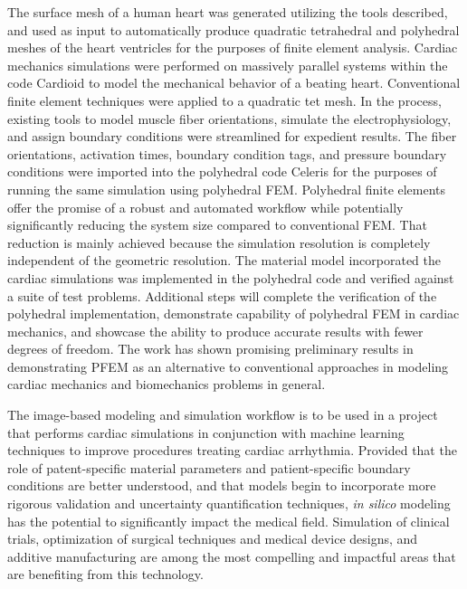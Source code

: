 The surface mesh of a human heart was generated utilizing the tools described, and used as input to automatically produce quadratic tetrahedral and polyhedral meshes of the heart ventricles for the purposes of finite element analysis. Cardiac mechanics simulations were performed on massively parallel systems within the code Cardioid to model the mechanical behavior of a beating heart. Conventional finite element techniques were applied to a quadratic tet mesh. In the process, existing tools to model muscle fiber orientations, simulate the electrophysiology, and assign boundary conditions were streamlined for expedient results. The fiber orientations, activation times, boundary condition tags, and pressure boundary conditions were imported into the polyhedral code Celeris for the purposes of running the same simulation using polyhedral FEM. Polyhedral finite elements offer the promise of a robust and automated workflow while potentially significantly reducing the system size compared to conventional FEM. That reduction is mainly achieved because the simulation resolution is completely independent of the geometric resolution. The material model incorporated the cardiac simulations was implemented in the polyhedral code and verified against a suite of test problems. Additional steps will complete the verification of the polyhedral implementation, demonstrate capability of polyhedral FEM in cardiac mechanics, and showcase the ability to produce accurate results with fewer degrees of freedom. The work has shown promising preliminary results in demonstrating PFEM as an alternative to conventional approaches in modeling cardiac mechanics and biomechanics problems in general.

The image-based modeling and simulation workflow is to be used in a project that performs cardiac simulations in conjunction with machine learning techniques to improve procedures treating cardiac arrhythmia. Provided that the role of patent-specific material parameters and patient-specific boundary conditions are better understood, and that models begin to incorporate more rigorous validation and uncertainty quantification techniques, \textit{in silico} modeling has the potential to significantly impact the medical field. Simulation of clinical trials, optimization of surgical techniques and medical device designs, and additive manufacturing are among the most compelling and impactful areas that are benefiting from this technology.